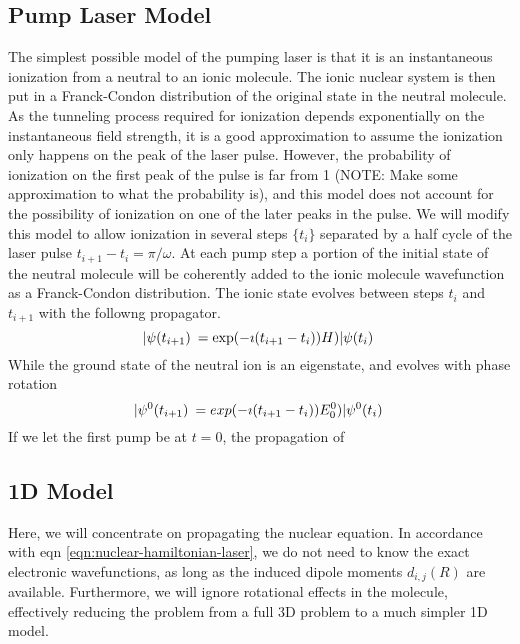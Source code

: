 \documentclass[a4paper]{article}
\begin{document}
\subsection{Pump Laser Model}
The simplest possible model of the pumping laser is that it is an instantaneous ionization from a neutral to an ionic molecule. The ionic nuclear system is then put in a Franck-Condon distribution of the original state in the neutral molecule. As the tunneling process required
for ionization depends exponentially on the instantaneous field strength, it is a good approximation to assume the ionization only happens on the
peak of the laser pulse. However, the probability of ionization on the first peak of the pulse is far from 1 (NOTE: Make some approximation to what the probability is), and this model does not account for the possibility of ionization on one of the later peaks in the pulse. We will modify this model to allow ionization in several steps $\{t_i\}$ separated by a half cycle of the laser pulse $t_{i+1} - t_{i} = \pi/\omega$. At each pump step a portion of the initial state of the neutral molecule will be coherently added to the ionic molecule wavefunction as a Franck-Condon distribution. The ionic state evolves between steps $t_i$ and $t_{i+1}$ with the followng propagator.
\begin{equation}
	|\psi(t_{i+1})\> = \exp(- \imath (t_{i+1} - t_i)) H) |\psi(t_i)\>
\end{equation}
While the ground state of the neutral ion is an eigenstate, and evolves with phase rotation
\begin{equation}
	|\psi^0(t_{i+1})\> = exp(- \imath (t_{i+1} - t_i)) E^0_0) |\psi^0(t_i)\>
\end{equation}
If we  let the first pump be at $t=0$, the propagation of


\subsection{1D Model}
Here, we will concentrate on propagating the nuclear equation. In accordance with eqn \ref{eqn:nuclear-hamiltonian-laser}, we do not need to know the exact electronic wavefunctions, as long as the induced dipole moments $d_{i,j}(R)$ are available. Furthermore, we will ignore rotational effects in the molecule, effectively reducing the problem from a full 3D problem to a much simpler 1D model.
\end{document}
